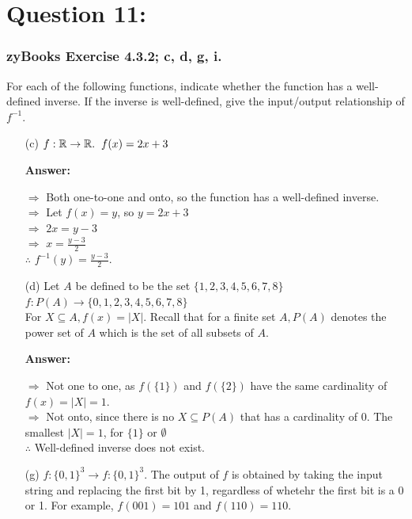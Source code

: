 \documentclass[14pt]{extreport}
\newcommand{\answer}[0]{\medskip \textbf{Answer:} \medskip}
\begin{document}
\section*{Question 11:}

\subsubsection*{zyBooks Exercise 4.3.2; c, d, g, i.}
    
For each of the following functions, indicate whether the function has a well-defined inverse. If the inverse is well-defined, give the input/output relationship of $f^{-1}$.
    
\begin{enumerate}
    \item[(c)] $f: \mathbb{R} \to \mathbb{R}. \hspace{2mm} f(x) = 2x+3$
    
        \answer

        $\Rightarrow$ Both one-to-one and onto, so the function has a well-defined inverse. \\
        $\Rightarrow$ Let $f(x)=y$, so $y=2x+3$\\
        $\Rightarrow$ $2x=y-3$\\
        $\Rightarrow$ $x=\frac{y-3}{2}$\\
        $\therefore$ $f^{-1}(y) = \frac{y-3}{2}$.
        \newline
    
    \item[(d)] Let $A$ be defined to be the set $\{1,2,3,4,5,6,7,8\}$ \\
    $f: P(A) \rightarrow \{0,1,2,3,4,5,6,7,8\}$ \\
    For $X \subseteq A, f(x) = |X|$. Recall that for a finite set $A, P(A)$ denotes the power set of $A$ which is the set of all subsets of $A$.
    
        \answer

        $\Rightarrow$ Not one to one, as $f(\{1\})$ and $f(\{2\})$ have the same cardinality of $f(x) = |X| = 1$. \\
        $\Rightarrow$ Not onto, since there is no $X \subseteq P(A)$ that has a cardinality of 0. The smallest $|X| =1$, for $\{1\}$ or $\emptyset$ \\
        $\therefore$ Well-defined inverse does not exist.
        \newline
        
    \item[(g)] $f:\{0,1\}^3 \rightarrow f:\{0,1\}^3$. The output of $f$ is obtained by taking the input string and replacing the first bit by 1, regardless of whetehr the first bit is a 0 or 1. For example, $f(001) = 101$ and $f(110) = 110.$
        

\end{enumerate}
\end{document}

